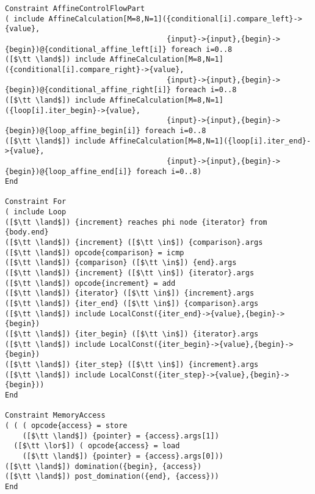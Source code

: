 \begin{lstlisting}[language=CAnDL]
Constraint AffineControlFlowPart
( include AffineCalculation[M=8,N=1]({conditional[i].compare_left}->{value},
                                     {input}->{input},{begin}->{begin})@{conditional_affine_left[i]} foreach i=0..8
([$\tt \land$]) include AffineCalculation[M=8,N=1]({conditional[i].compare_right}->{value},
                                     {input}->{input},{begin}->{begin})@{conditional_affine_right[i]} foreach i=0..8
([$\tt \land$]) include AffineCalculation[M=8,N=1]({loop[i].iter_begin}->{value},
                                     {input}->{input},{begin}->{begin})@{loop_affine_begin[i]} foreach i=0..8
([$\tt \land$]) include AffineCalculation[M=8,N=1]({loop[i].iter_end}->{value},
                                     {input}->{input},{begin}->{begin})@{loop_affine_end[i]} foreach i=0..8)
End

Constraint For
( include Loop
([$\tt \land$]) {increment} reaches phi node {iterator} from {body.end}
([$\tt \land$]) {increment} ([$\tt \in$]) {comparison}.args
([$\tt \land$]) opcode{comparison} = icmp
([$\tt \land$]) {comparison} ([$\tt \in$]) {end}.args
([$\tt \land$]) {increment} ([$\tt \in$]) {iterator}.args
([$\tt \land$]) opcode{increment} = add
([$\tt \land$]) {iterator} ([$\tt \in$]) {increment}.args
([$\tt \land$]) {iter_end} ([$\tt \in$]) {comparison}.args
([$\tt \land$]) include LocalConst({iter_end}->{value},{begin}->{begin})
([$\tt \land$]) {iter_begin} ([$\tt \in$]) {iterator}.args
([$\tt \land$]) include LocalConst({iter_begin}->{value},{begin}->{begin})
([$\tt \land$]) {iter_step} ([$\tt \in$]) {increment}.args
([$\tt \land$]) include LocalConst({iter_step}->{value},{begin}->{begin}))
End

Constraint MemoryAccess
( ( ( opcode{access} = store
    ([$\tt \land$]) {pointer} = {access}.args[1])
  ([$\tt \lor$]) ( opcode{access} = load
    ([$\tt \land$]) {pointer} = {access}.args[0]))
([$\tt \land$]) domination({begin}, {access})
([$\tt \land$]) post_domination({end}, {access}))
End


\end{lstlisting}
